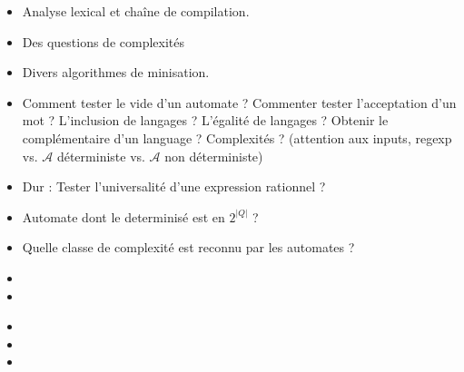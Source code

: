 \documentclass{agregfiche}
\begin{document}
\secidees
\begin{itemize}
\item Analyse lexical et chaîne de compilation.
\item Des questions de complexités
\item Divers algorithmes de minisation.
\end{itemize}


\secquestionsclassiques
\begin{itemize}
\item Comment tester le vide d'un automate ? Commenter tester l'acceptation d'un mot ? L'inclusion de langages ? L'égalité de langages ? Obtenir le complémentaire d'un language ? Complexités ? (attention aux inputs, regexp vs. $\mathcal{A}$ déterministe vs. $\mathcal{A}$ non déterministe)
\item Dur : Tester l'universalité d'une expression rationnel ?
\item Automate dont le determinisé est en $2^|Q|$ ?
\item Quelle classe de complexité est reconnu par les automates ?
\end{itemize}

\secreferences
\begin{itemize}
\item 
\item 
\end{itemize}

\secdev
\begin{itemize}
\item 
\item 
\item 

\end{itemize}
\end{document}
